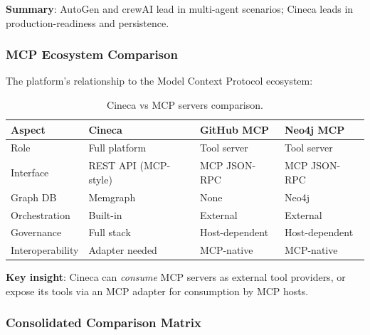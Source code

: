 \textbf{Summary}: AutoGen and crewAI lead in multi-agent scenarios; Cineca leads in production-readiness and persistence.

\subsubsection{MCP Ecosystem Comparison}

The platform's relationship to the Model Context Protocol ecosystem:

\begin{table}[ht]
\centering
\caption{Cineca vs MCP servers comparison.}
\label{tab:vs-mcp}
\small
\begin{tabular}{llll}
\hline
\textbf{Aspect} & \textbf{Cineca} & \textbf{GitHub MCP} & \textbf{Neo4j MCP} \\
\hline
Role & Full platform & Tool server & Tool server \\
Interface & REST API (MCP-style) & MCP JSON-RPC & MCP JSON-RPC \\
Graph DB & Memgraph & None & Neo4j \\
Orchestration & Built-in & External & External \\
Governance & Full stack & Host-dependent & Host-dependent \\
Interoperability & Adapter needed & MCP-native & MCP-native \\
\hline
\end{tabular}
\end{table}

\textbf{Key insight}: Cineca can \textit{consume} MCP servers as external tool providers, or expose its tools via an MCP adapter for consumption by MCP hosts.

\subsubsection{Consolidated Comparison Matrix}

